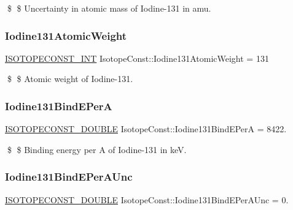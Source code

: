 \$ \$ Uncertainty in atomic mass of Iodine-\/131 in amu. \mbox{\label{group___isotope_const-_iodine-_i131_gaa835c71998531ec2809fe08a7a8e7c1f}} 
\subsubsection{\texorpdfstring{Iodine131\+Atomic\+Weight}{Iodine131AtomicWeight}}
{\footnotesize\ttfamily \mbox{\hyperlink{group___isotope_const-_macros_ga5f18360b3e99483a35c32d789e62621c}{I\+S\+O\+T\+O\+P\+E\+C\+O\+N\+S\+T\+\_\+\+I\+NT}} Isotope\+Const\+::\+Iodine131\+Atomic\+Weight = 131}

\$ \$ Atomic weight of Iodine-\/131. \mbox{\label{group___isotope_const-_iodine-_i131_ga3ea8c842bca5199b72d33350a253f776}} 
\subsubsection{\texorpdfstring{Iodine131\+Bind\+E\+PerA}{Iodine131BindEPerA}}
{\footnotesize\ttfamily \mbox{\hyperlink{group___isotope_const-_macros_ga8f45a7272ce02c0b4c65c44636ed719a}{I\+S\+O\+T\+O\+P\+E\+C\+O\+N\+S\+T\+\_\+\+D\+O\+U\+B\+LE}} Isotope\+Const\+::\+Iodine131\+Bind\+E\+PerA = 8422.}

\$ \$ Binding energy per A of Iodine-\/131 in keV. \mbox{\label{group___isotope_const-_iodine-_i131_ga3b0a031be500ff25e46e49b8b29abd57}} 
\subsubsection{\texorpdfstring{Iodine131\+Bind\+E\+Per\+A\+Unc}{Iodine131BindEPerAUnc}}
{\footnotesize\ttfamily \mbox{\hyperlink{group___isotope_const-_macros_ga8f45a7272ce02c0b4c65c44636ed719a}{I\+S\+O\+T\+O\+P\+E\+C\+O\+N\+S\+T\+\_\+\+D\+O\+U\+B\+LE}} Isotope\+Const\+::\+Iodine131\+Bind\+E\+Per\+A\+Unc = 0.}

